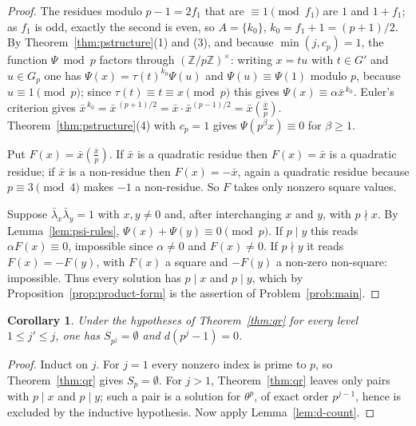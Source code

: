 \documentclass[a4paper]{article}
\newtheorem{corollary}[theorem]{Corollary}
\newcommand{\Z}{\mathbb{Z}}
\begin{document}
\begin{proof}
	The residues modulo $p-1=2f_1$ that are $\equiv1\pmod{f_1}$ are $1$ and
	$1+f_1$; as $f_1$ is odd, exactly the second is even, so $A=\{k_0\}$,
	$k_0=f_1+1=(p+1)/2$.
	By Theorem~\ref{thm:pstructure}(1) and (3), and because
	$\min(j,c_p)=1$, the function $\Psi\bmod p$ factors through
	$(\Z/p\Z)^{\times}$: writing $x=tu$ with $t\in G'$ and $u\in G_p$ one
	has $\Psi(x)=\tau(t)^{k_0}\Psi(u)$ and $\Psi(u)\equiv\Psi(1)$ modulo
	$p$, because $u\equiv1\pmod p$; since $\tau(t)\equiv t\equiv x\pmod p$
	this gives $\Psi(x)\equiv\alpha\bar x^{\,k_0}$.
	Euler's criterion gives
	$\bar x^{\,k_0}=\bar x^{\,(p+1)/2}
	=\bar x\cdot\bar x^{(p-1)/2}=\bar x\left(\frac{\bar x}p\right)$.
	Theorem~\ref{thm:pstructure}(4) with $c_p=1$ gives
	$\Psi(p^{\beta}x)\equiv0$ for $\beta\geq1$.

	Put $F(x)=\bar x\left(\frac{\bar x}p\right)$.  If $\bar x$ is a
	quadratic residue then $F(x)=\bar x$ is a quadratic residue; if
	$\bar x$ is a non-residue then $F(x)=-\bar x$, again a quadratic
	residue because $p\equiv3\pmod4$ makes $-1$ a non-residue.  So $F$
	takes only nonzero square values.

	Suppose $\bar\lambda_x\bar\lambda_y=1$ with $x,y\ne0$ and, after
	interchanging $x$ and $y$, with $p\nmid x$.  By
	Lemma~\ref{lem:psi-rules}, $\Psi(x)+\Psi(y)\equiv0\pmod p$.
	If $p\mid y$ this reads $\alpha F(x)\equiv0$, impossible since
	$\alpha\ne0$ and $F(x)\ne0$.
	If $p\nmid y$ it reads $F(x)=-F(y)$, with $F(x)$ a square and $-F(y)$ a
	non-zero non-square: impossible.
	Thus every solution has $p\mid x$ and $p\mid y$, which by
	Proposition~\ref{prop:product-form} is the assertion of
	Problem~\ref{prob:main}.
\end{proof}

\begin{corollary}\label{cor:qr-nullity}
	Under the hypotheses of Theorem~\ref{thm:qr} for every level
	$1\leq j'\leq j$, one has $S_{p^{j}}=\emptyset$ and $d(p^{j}-1)=0$.
\end{corollary}

\begin{proof}
	Induct on $j$.  For $j=1$ every nonzero index is prime to $p$, so
	Theorem~\ref{thm:qr} gives $S_p=\emptyset$.  For $j>1$,
	Theorem~\ref{thm:qr} leaves only pairs with $p\mid x$ and $p\mid y$;
	such a pair is a solution for $\theta^{p}$, of exact order $p^{j-1}$,
	hence is excluded by the inductive hypothesis.  Now apply
	Lemma~\ref{lem:d-count}.
\end{proof}
\end{document}
